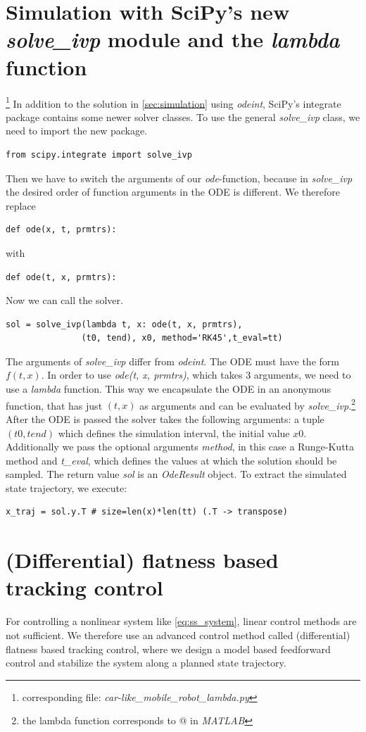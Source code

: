 \documentclass[a4paper,11pt,headings=standardclasses]{scrartcl}%
\begin{document}
\section{Simulation with SciPy's new \emph{solve\_ivp} module and the \emph{lambda} function}
\footnote{corresponding file: \emph{car-like\_mobile\_robot\_lambda.py}}
In addition to the solution in \autoref{sec:simulation} using \emph{odeint}, SciPy's integrate package contains some newer solver classes. To use the general \emph{solve\_ivp} class, we need to import the new package.
\begin{lstlisting}
from scipy.integrate import solve_ivp
\end{lstlisting}
Then we have to switch the arguments of our \emph{ode}-function, because in \emph{solve\_ivp} the desired order of function arguments in the ODE is different. We therefore replace
\begin{lstlisting}
def ode(x, t, prmtrs):
\end{lstlisting}
with 
\begin{lstlisting}
def ode(t, x, prmtrs):
\end{lstlisting}
Now we can call the solver.
\begin{lstlisting}
sol = solve_ivp(lambda t, x: ode(t, x, prmtrs), 
               (t0, tend), x0, method='RK45',t_eval=tt)
\end{lstlisting}
The arguments of \emph{solve\_ivp} differ from \emph{odeint}. The ODE must have the form $f(t,x)$. In order to use \emph{ode(t, x, prmtrs)}, which takes 3 arguments, we need to use a \emph{lambda} function. This way we encapsulate the ODE in an anonymous function, that has just $(t, x)$ as arguments and can be evaluated by \emph{solve\_ivp}.\footnote{the lambda function corresponds to @ in \emph{MATLAB}} After the ODE is passed the solver takes the following arguments: a tuple $(t0, tend)$ which defines the simulation interval, the initial value $x0$. Additionally we pass the optional arguments \emph{method}, in this case a Runge-Kutta method and \emph{t\_eval}, which defines the values at which the solution should be sampled. 
The return value \emph{sol} is an \emph{OdeResult} object. To extract the simulated state trajectory, we execute:
\begin{lstlisting}
x_traj = sol.y.T # size=len(x)*len(tt) (.T -> transpose)
\end{lstlisting}

\newpage
\section{(Differential) flatness based tracking control}
For controlling a nonlinear system like \eqref{eq:ss_system}, linear control methods are not sufficient. We therefore use an advanced control method called (differential) flatness based tracking control, where we design a model based feedforward control and stabilize the system along a planned state trajectory.
\end{document}
